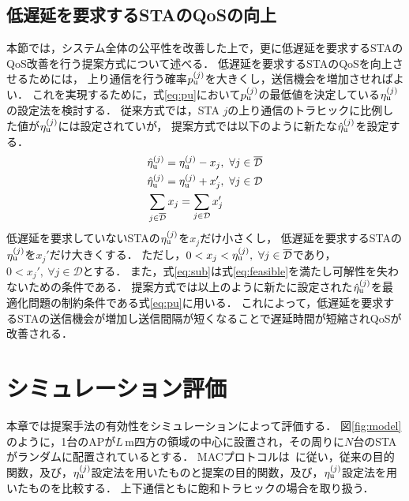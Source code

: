 \documentclass[technicalreport]{ieicej}
\newcommand{\etau}{\eta_{\rm u}^{(j)}}
\begin{document}
\subsection{低遅延を要求するSTAのQoSの向上}
	本節では，システム全体の公平性を改善した上で，更に低遅延を要求するSTAのQoS改善を行う提案方式について述べる．
	低遅延を要求するSTAのQoSを向上させるためには，
	上り通信を行う確率$p_{\rm u}^{(j)}$を大きくし，送信機会を増加させればよい．
	これを実現するために，式\eqref{eq:pu}において$p_{\rm u}^{(j)}$の最低値を決定している$\etau$の設定法を検討する．
	従来方式では，STA $j$の上り通信のトラヒックに比例した値が$\etau$には設定されていが，
	提案方式では以下のように新たな${\hat \eta}_{\rm u}^{(j)}$を設定する．
	\begin{align}
		&{\hat \eta}_{\rm u}^{(j)} = \etau -x_j,\ \forall j \in {\overline {\mathcal D}} \label{eq:etadbar}\\
		&{\hat \eta}_{\rm u}^{(j)} = \etau + x_j',\ \forall j \in {\mathcal D} \label{eq:etad}\\
		&\sum_{j\in{\overline {\mathcal D}}} x_j = \sum_{j\in{\mathcal D}} x_j' \label{eq:sub}
	\end{align}
	低遅延を要求していないSTAの$\etau$を$x_j$だけ小さくし，
	低遅延を要求するSTAの$\etau$を$x_j'$だけ大きくする．
	ただし，$0<x_j<\etau,\ \forall j\in{{\overline {\mathcal D}}}$であり，$0<x_j',\ \forall j\in{\mathcal D}$とする．
	また，式\eqref{eq:sub}は式\eqref{eq:feasible}を満たし可解性を失わないための条件である．
	提案方式では以上のように新たに設定された${\hat \eta}_{\rm u}^{(j)}$を最適化問題の制約条件である式\eqref{eq:pu}に用いる．
	これによって，低遅延を要求するSTAの送信機会が増加し送信間隔が短くなることで遅延時間が短縮されQoSが改善される．

\section{シミュレーション評価}
	本章では提案手法の有効性をシミュレーションによって評価する．
	図\ref{fig:model}のように，1台のAPが$L$\,m四方の領域の中心に設置され，その周りに$N$台のSTAがランダムに配置されているとする．
	MACプロトコルは~\cite{promac}に従い，従来の目的関数，及び，$\etau$設定法を用いたものと提案の目的関数，及び，$\etau$設定法を用いたものを比較する．
	上下通信ともに飽和トラヒックの場合を取り扱う．
\end{document}
